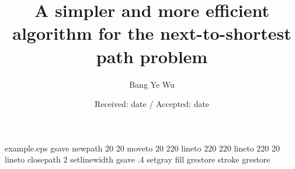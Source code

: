 
\begin{filecontents*}{example.eps}
gsave
newpath
  20 20 moveto
  20 220 lineto
  220 220 lineto
  220 20 lineto
closepath
2 setlinewidth
gsave
  .4 setgray fill
grestore
stroke
grestore
\end{filecontents*}
\RequirePackage{fix-cm}
\documentclass[smallextended]{svjour3}       \smartqed  \usepackage{graphicx}



\title{A simpler and more efficient algorithm for the next-to-shortest path problem}


\author{Bang Ye Wu}



\date{Received: date / Accepted: date}


\maketitle

\begin{abstract}
Given an undirected graph $G=(V,E)$ with positive edge lengths and two vertices $s$ and $t$, the next-to-shortest path problem is to find an $st$-path which length is minimum amongst all $st$-paths strictly longer than the shortest path length. In this paper we show that the problem can be solved in linear time if the distances from $s$ and $t$ to all other vertices are given. Particularly our new algorithm runs in $O(|V|\log |V|+|E|)$ time for general graphs, which improves the previous result of $O(|V|^2)$ time for sparse graphs, and takes only linear time for unweighted graphs, planar graphs, and graphs with positive integer edge lengths.  

\end{abstract}

\section{Introduction}


Let $G=(V,E,w)$ be an undirected graph, in which $w$ is a positive edge length function.
For $s,t\in V$, an $st$-path is a simple path from $s$ to $t$, in which ``simple'' means there is no repeated vertex in the path. In this paper, a path always means a simple path.
The length of a path is the total length of all edges in the path.
An $st$-path is a shortest $st$-path if its length is minimum amongst all possible $st$-paths.
The shortest path length from $s$ to $t$ is denoted by $d(s,t)$ which is the length of their shortest path.
A \emph{next-to-shortest} $st$-path is an $st$-path which length is minimum amongst those the path lengths \emph{strictly larger} than $d(s,t)$. And the next-to-shortest path problem is to find a next-to-shortest $st$-path for given $G$, $s$ and $t$. 

